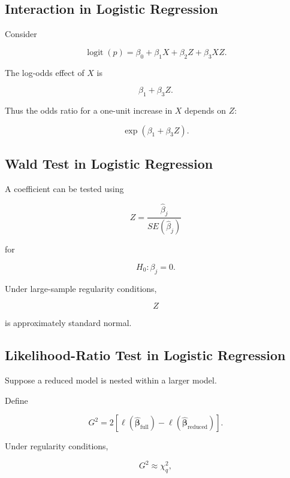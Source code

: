 \subsection{Interaction in Logistic Regression}
\label{subsec:logistic-interaction}

Consider

\[
\boxed{
\operatorname{logit}(p)
=
\beta_0
+
\beta_1X
+
\beta_2Z
+
\beta_3XZ.
}
\]

The log-odds effect of \(X\) is

\[
\boxed{
\beta_1+\beta_3Z.
}
\]

Thus the odds ratio for a one-unit increase in \(X\) depends on \(Z\):

\[
\boxed{
\exp
(
\beta_1+\beta_3Z
).
}
\]

\subsection{Wald Test in Logistic Regression}
\label{subsec:wald-test-logistic}

A coefficient can be tested using

\[
\boxed{
Z
=
\frac{
\widehat{\beta}_j
}{
SE(\widehat{\beta}_j)
}
}
\]

for

\[
H_0:\beta_j=0.
\]

Under large-sample regularity conditions,

\[
Z
\]

is approximately standard normal.

\subsection{Likelihood-Ratio Test in Logistic Regression}
\label{subsec:lr-test-logistic}

Suppose a reduced model is nested within a larger model.

Define

\[
\boxed{
G^2
=
2
\left[
\ell(\widehat{\boldsymbol{\beta}}_{\text{full}})
-
\ell(\widehat{\boldsymbol{\beta}}_{\text{reduced}})
\right].
}
\]

Under regularity conditions,

\[
\boxed{
G^2
\approx
\chi^2_q,
}
\]

